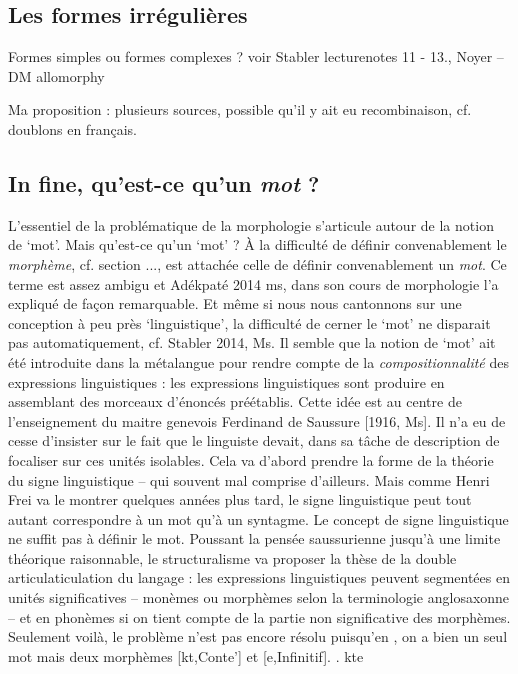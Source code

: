     \subsection{Les formes irr\'eguli\`eres}
      Formes simples ou formes complexes ? voir Stabler lecturenotes 11 - 13., Noyer -- DM allomorphy
      
      Ma proposition : plusieurs sources, possible qu'il y ait eu recombinaison, cf. doublons en fran\c{c}ais.
    
    \subsection{In fine, qu'est-ce qu'un \textit{mot} ?}
         
      L'essentiel de la probl\'ematique de la morphologie s'articule autour de la notion de `mot'. Mais qu'est-ce qu'un `mot' ? \`A la difficult\'e de d\'efinir convenablement le \textit{morph\`eme}, cf. section ..., est attach\'ee celle de d\'efinir convenablement un \textit{mot}. Ce terme est assez ambigu et Ad\'ekpat\'e 2014 ms, dans son cours de morphologie l'a expliqu\'e de fa\c con remarquable. Et m\^eme si nous nous cantonnons sur une conception \`a peu pr\`es `linguistique', la difficult\'e de cerner le `mot' ne disparait pas automatiquement, cf. Stabler 2014, Ms. Il semble que la notion de `mot' ait \'et\'e introduite dans la m\'etalangue pour rendre compte de la \textit{compositionnalit\'e} des expressions linguistiques : les expressions linguistiques sont produire en assemblant des morceaux d'\'enonc\'es pr\'e\'etablis. Cette id\'ee est au centre de l'enseignement du maitre genevois Ferdinand de Saussure [1916, Ms]. Il n'a eu de cesse d'insister sur le fait que le linguiste devait, dans sa t\^ache de description de focaliser sur ces unit\'es isolables. Cela va d'abord prendre la forme de la th\'eorie du signe linguistique -- qui souvent mal comprise d'ailleurs. Mais comme Henri Frei va le montrer quelques ann\'ees plus tard, le signe linguistique peut tout autant correspondre \`a un mot qu'\`a un syntagme. Le concept de signe linguistique ne suffit pas \`a d\'efinir le mot. Poussant la pens\'ee saussurienne jusqu'\`a une limite th\'eorique raisonnable, le structuralisme va proposer la th\`ese de la double articulaticulation du langage : les expressions linguistiques peuvent segment\'ees en unit\'es significatives -- mon\`emes ou morph\`emes selon la terminologie anglosaxonne -- et en phon\`emes si on tient compte de la partie non significative des morph\`emes. Seulement voil\`a, le probl\`eme n'est pas encore r\'esolu puisqu'en \Next, on a bien un seul mot mais deux morph\`emes [k\textsubtilde{\oo}t,Conte'] et [e,Infinitif]. 
      \ex. k\textsubtilde{\oo}te
      
